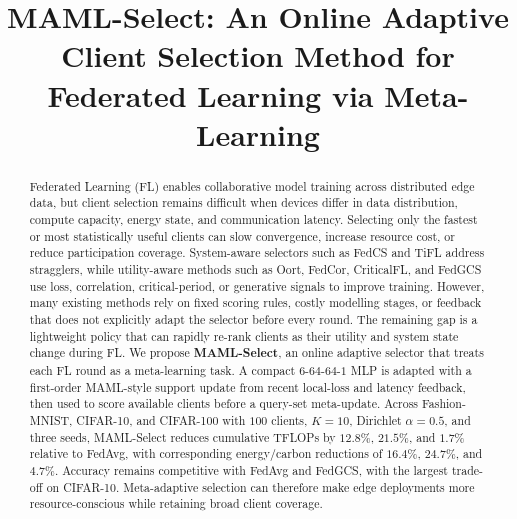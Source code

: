 \documentclass[journal]{IEEEtran}
\newcommand{\revision}[1]{#1}
\begin{document}
\title{MAML-Select: An Online Adaptive Client Selection Method for Federated Learning via Meta-Learning}


\maketitle

\begin{abstract}
\revision{Federated Learning (FL) enables collaborative model training across distributed edge data, but client selection remains difficult when devices differ in data distribution, compute capacity, energy state, and communication latency. Selecting only the fastest or most statistically useful clients can slow convergence, increase resource cost, or reduce participation coverage. System-aware selectors such as FedCS and TiFL address stragglers, while utility-aware methods such as Oort, FedCor, CriticalFL, and FedGCS use loss, correlation, critical-period, or generative signals to improve training. However, many existing methods rely on fixed scoring rules, costly modelling stages, or feedback that does not explicitly adapt the selector before every round. The remaining gap is a lightweight policy that can rapidly re-rank clients as their utility and system state change during FL. We propose \textbf{MAML-Select}, an online adaptive selector that treats each FL round as a meta-learning task. A compact $6$-$64$-$64$-$1$ MLP is adapted with a first-order MAML-style support update from recent local-loss and latency feedback, then used to score available clients before a query-set meta-update. Across Fashion-MNIST, CIFAR-10, and CIFAR-100 with $100$ clients, $K=10$, Dirichlet $\alpha=0.5$, and three seeds, MAML-Select reduces cumulative TFLOPs by $12.8\%$, $21.5\%$, and $1.7\%$ relative to FedAvg, with corresponding energy/carbon reductions of $16.4\%$, $24.7\%$, and $4.7\%$. Accuracy remains competitive with FedAvg and FedGCS, with the largest trade-off on CIFAR-10. Meta-adaptive selection can therefore make edge deployments more resource-conscious while retaining broad client coverage.}
\end{abstract}
\end{document}
